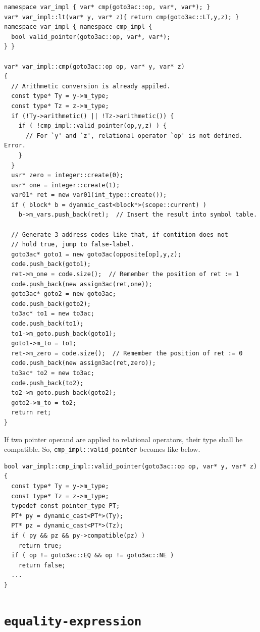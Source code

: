 \begin{verbatim}
namespace var_impl { var* cmp(goto3ac::op, var*, var*); }
var* var_impl::lt(var* y, var* z){ return cmp(goto3ac::LT,y,z); }
namespace var_impl { namespace cmp_impl {
  bool valid_pointer(goto3ac::op, var*, var*);
} }

var* var_impl::cmp(goto3ac::op op, var* y, var* z)
{
  // Arithmetic conversion is already appiled.
  const type* Ty = y->m_type;
  const type* Tz = z->m_type;
  if (!Ty->arithmetic() || !Tz->arithmetic()) {
    if ( !cmp_impl::valid_pointer(op,y,z) ) {
      // For `y' and `z', relational operator `op' is not defined. Error.
    }
  }
  usr* zero = integer::create(0);
  usr* one = integer::create(1);
  var01* ret = new var01(int_type::create());
  if ( block* b = dyanmic_cast<block*>(scope::current) )
    b->m_vars.push_back(ret);  // Insert the result into symbol table.

  // Generate 3 address codes like that, if contition does not
  // hold true, jump to false-label.
  goto3ac* goto1 = new goto3ac(opposite[op],y,z);
  code.push_back(goto1);
  ret->m_one = code.size();  // Remember the position of ret := 1
  code.push_back(new assign3ac(ret,one));
  goto3ac* goto2 = new goto3ac;
  code.push_back(goto2);
  to3ac* to1 = new to3ac;
  code.push_back(to1);
  to1->m_goto.push_back(goto1);
  goto1->m_to = to1;
  ret->m_zero = code.size();  // Remember the position of ret := 0
  code.push_back(new assign3ac(ret,zero));
  to3ac* to2 = new to3ac;
  code.push_back(to2);
  to2->m_goto.push_back(goto2);
  goto2->m_to = to2;
  return ret;
}
\end{verbatim}
If two pointer operand are applied to relational operators,
their type shall be compatible. So, {\tt{cmp\_impl::valid\_pointer}}
becomes like below.
\begin{verbatim}
bool var_impl::cmp_impl::valid_pointer(goto3ac::op op, var* y, var* z)
{
  const type* Ty = y->m_type;
  const type* Tz = z->m_type;
  typedef const pointer_type PT;
  PT* py = dynamic_cast<PT*>(Ty);
  PT* pz = dynamic_cast<PT*>(Tz);
  if ( py && pz && py->compatible(pz) )
    return true;
  if ( op != goto3ac::EQ && op != goto3ac::NE )
    return false;
  ...
}
\end{verbatim}

\section{\tt{equality-expression}}
\label{expr_e012}

